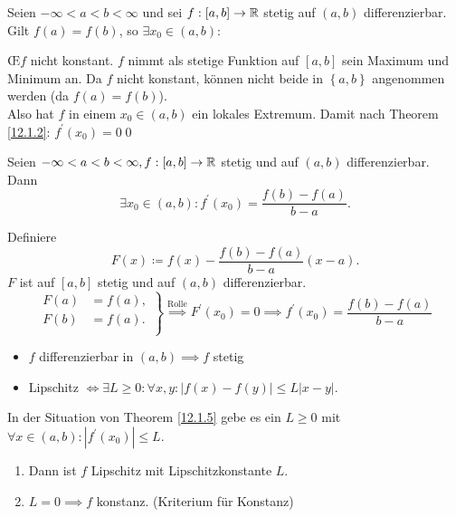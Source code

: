 \begin{subtheorem}[Rolle]
	Seien $ -\infty<a<b<\infty $ und sei $ f : [a,b] \to \mathbb{R}  $ stetig auf $ (a, b) $ differenzierbar. Gilt $ f(a) = f(b) $, so $ \exists x_0 \in (a, b) : $ 
\end{subtheorem}

\begin{subproof*}
	\OE $ f $ nicht konstant. $ f $ nimmt als stetige Funktion auf $ [a, b] $ sein Maximum und Minimum an. Da $ f $ nicht konstant, können nicht beide in $ \left\{ a, b \right\}  $ angenommen werden (da $ f(a) = f(b) $).\\
	Also hat $ f $ in einem $ x_0 \in (a, b) $ ein lokales Extremum.
	Damit nach Theorem \ref{12.1.2}: $ f^\prime(x_0) = 0 $\qed
\end{subproof*}

\begin{subtheorem}[Mittelwertsatz]
	Seien $ -\infty < a < b < \infty, f : [a, b] \to \mathbb{R}  $ stetig und auf $ (a, b) $ differenzierbar. Dann
	\[
		\exists x_0 \in (a, b) : f^\prime(x_0) = \frac{ f(b) - f(a) }{ b - a } .
	\]
	
\end{subtheorem}

\begin{subproof}
	Definiere
	\[
		F(x) \coloneqq f(x) - \frac{ f(b) - f(a) }{ b - a } (x - a).
	\]
	$ F $ ist auf $ [a, b] $ stetig und auf $ (a, b) $ differenzierbar.
	\[
		\left.\begin{matrix}
				F(a) &= f(a),\\
				F(b) &= f(a).\\
			\end{matrix}
		\right\} \overset{\text{Rolle} }{\implies }F^\prime(x_0) = 0 \implies f^\prime(x_0) = \frac{ f(b) - f(a) }{ b - a } 
	\]
\end{subproof}

\begin{itemize}
	\item $ f $ differenzierbar in $ (a, b) \implies f $ stetig
	\item Lipschitz $ \iff \exists L \geq 0 : \forall x, y : \left| f(x) - f(y) \right| \leq L \left| x - y \right|  $.
\end{itemize}

\begin{subtheorem}
	In der Situation von Theorem \ref{12.1.5} gebe es ein $ L \geq 0 $ mit $ \forall x \in (a, b) : \left| f^\prime(x_0) \right| \leq L $.
	\begin{enumerate}[label=(\roman*)]
		\item Dann ist $ f $ Lipschitz mit Lipschitzkonstante $ L $.
		\item $ L = 0 \implies f $ konstanz. (Kriterium für Konstanz)
	\end{enumerate}
	
\end{subtheorem}

